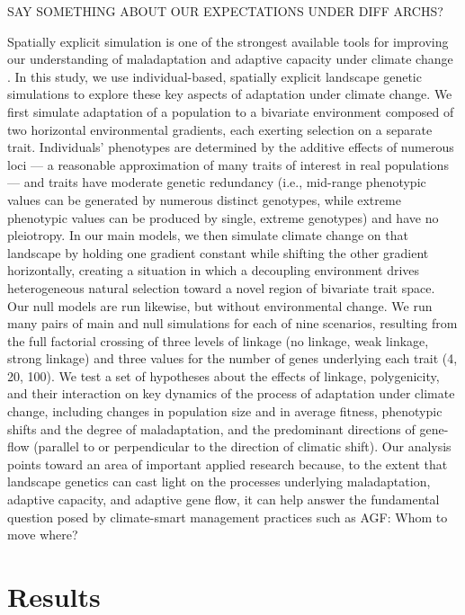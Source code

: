 \documentclass[9pt,twocolumn,twoside,lineno]{pnas-new}
\begin{document}
SAY SOMETHING ABOUT OUR EXPECTATIONS UNDER DIFF ARCHS?





Spatially explicit simulation is one of the strongest available tools
for improving our understanding of maladaptation and adaptive capacity
under climate change \cite{capblancq_review}.
In this study, we use individual-based, spatially explicit landscape genetic simulations to
explore these key aspects of adaptation under climate change. We first simulate 
adaptation of a population to a bivariate environment composed of two horizontal 
environmental gradients, each exerting selection on a separate trait.
Individuals' phenotypes are determined by the additive effects of numerous loci ---
a reasonable approximation of many traits of interest in real populations \cite{sella} ---
and traits have moderate genetic redundancy 
(i.e., mid-range phenotypic values
can be generated by numerous distinct genotypes, while extreme phenotypic
values can be produced by single, extreme genotypes) and have no pleiotropy.
In our main models, we then simulate climate change on that landscape by holding one gradient 
constant while shifting the other gradient horizontally, creating a situation in which
a decoupling environment drives heterogeneous natural selection toward a novel region 
of bivariate trait space. Our null models are run likewise, but without environmental 
change. We run many pairs of main and null simulations for each of nine scenarios, 
resulting from the full factorial crossing of three levels of linkage (no linkage, weak 
linkage, strong linkage) and three values for the number of genes underlying each 
trait (4, 20, 100). We test a set of hypotheses about the effects of linkage,
polygenicity, and their interaction on key 
dynamics of the process of adaptation under climate change, including changes in 
population size and in average fitness, phenotypic shifts and the degree of 
maladaptation, and the predominant directions of gene-flow (parallel to or 
perpendicular to the direction of climatic shift). Our analysis points toward an area 
of important applied research because, to the extent that landscape genetics can cast 
light on the processes underlying maladaptation, adaptive capacity, and adaptive gene
flow, it can help answer the fundamental question posed by climate-smart management 
practices such as AGF: Whom to move where?


\section*{Results}
\end{document}
